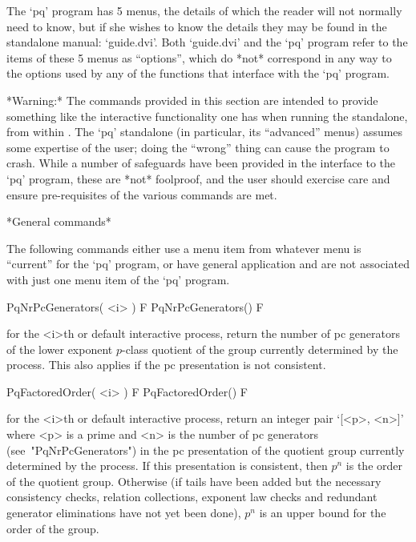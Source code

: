 
The `pq' program has 5 menus, the details of which  the  reader  will  not
normally need to know, but if she wishes to know the details they may  be
found in the standalone manual: `guide.dvi'.  Both  `guide.dvi'  and  the
`pq' program refer to the items of these 5 menus as ``options'', which  do
*not* correspond in any way to the options used  by  any  of  the  {\GAP}
functions that interface with the `pq' program.

*Warning:*
The commands provided in this section are intended to  provide  something
like the interactive functionality one has when running  the  standalone,
from within {\GAP}. The `pq' standalone (in particular, its  ``advanced''
menus) assumes some expertise of the user; doing the ``wrong'' thing  can
cause the program to crash.  While  a  number  of  safeguards  have  been
provided in the {\GAP} interface to the `pq'  program,  these  are  *not*
foolproof, and the user should exercise care and ensure pre-requisites of
the various commands are met.

*General commands*

The following commands either use a  menu  item  from  whatever  menu  is
``current'' for the `pq' program, or have general application and are  not
associated with just one menu item of the `pq' program.

\>PqNrPcGenerators( <i> ) F
\>PqNrPcGenerators() F

for the <i>th or default  interactive {\ANUPQ} process, return the number
of pc  generators of the lower  exponent $p$-class quotient  of the group
currently  determined  by the  process.   This  also  applies if  the  pc
presentation is not consistent.

\>PqFactoredOrder( <i> ) F
\>PqFactoredOrder() F

for the <i>th or default interactive {\ANUPQ} process, return an  integer
pair `[<p>, <n>]' where <p> is a prime  and  <n>  is  the  number  of  pc
generators  (see~"PqNrPcGenerators")  in  the  pc  presentation  of   the
quotient group currently determined by the process. If this  presentation
is consistent, then $p^n$ is the order of the quotient  group.  Otherwise
(if tails have been added but the necessary consistency checks,  relation
collections, exponent law checks  and  redundant  generator  eliminations
have not yet been done), $p^n$ is an upper bound for  the  order  of  the
group.

